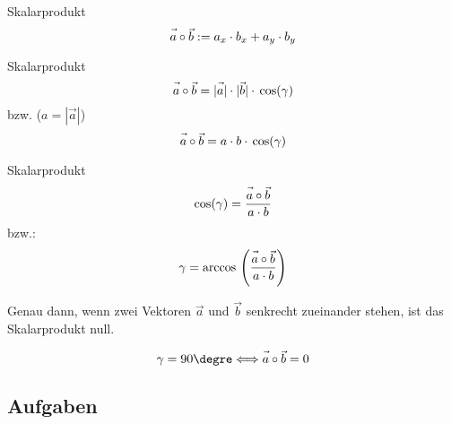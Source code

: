 \begin{definition}{Skalarprodukt}{}
  $$\vec{a\vphantom{b}}\circ\vec{b} := a_x\cdot{}b_x + a_y \cdot{} b_y$$
\end{definition}

\newpage


\begin{gesetz}{Skalarprodukt}{}
  $$\vec{a\vphantom{b}} \circ \vec{b} = |\vec{a\vphantom{b}}| \cdot{} |\vec{b}| \cdot{} \cos(\gamma)$$
bzw. ($a=|\vec{a}|$)
  $$\vec{a\vphantom{b}} \circ \vec{b} = a \cdot{} b \cdot{} \cos(\gamma)$$
\end{gesetz}

\begin{gesetz}{Skalarprodukt}{}
  $$\cos(\gamma) = \frac{\vec{a\vphantom{b}}\circ\vec{b}}{a\cdot b}$$
  bzw.:
  $$\gamma = \arccos{} \left(\frac{\vec{a\vphantom{b}}\circ\vec{b}}{a\cdot b}\right)$$
  
\end{gesetz}

\begin{bemerkung}{}{}
  Genau dann, wenn zwei Vektoren $\vec{a}$ und $\vec{b}$ senkrecht
  zueinander stehen, ist das Skalarprodukt null.

  $$\gamma=90\degre   \Longleftrightarrow  \vec{a\vphantom{b}}\circ\vec{b}=0$$
  \end{bemerkung}


\subsection*{Aufgaben}

\newpage
